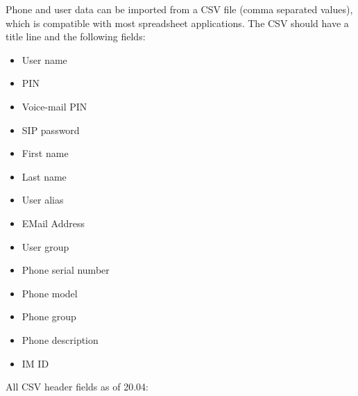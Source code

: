 \documentclass[letterpaper,10pt,english]{sphinxmanual}
\begin{document}
Phone and user data can be imported from a CSV file (comma separated values), which is compatible with most spreadsheet applications. The CSV should have a title line and the following fields:
\begin{itemize}
\item {} 
User name

\item {} 
PIN

\item {} 
Voice-mail PIN

\item {} 
SIP password

\item {} 
First name

\item {} 
Last name

\item {} 
User alias

\item {} 
EMail Address

\item {} 
User group

\item {} 
Phone serial number

\item {} 
Phone model

\item {} 
Phone group

\item {} 
Phone description

\item {} 
IM ID

\end{itemize}

All CSV header fields as of 20.04:
\end{document}
